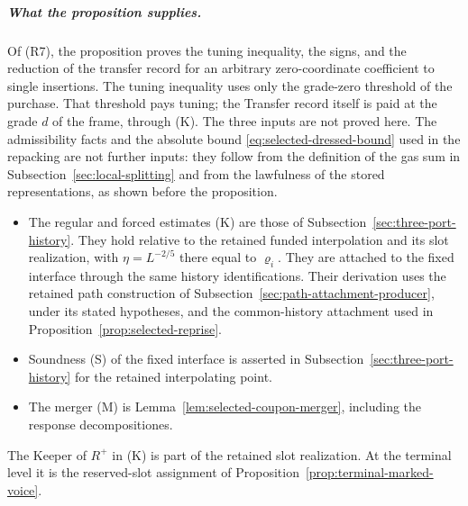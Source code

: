 \subparagraph{What the proposition supplies.}
Of (R7), the proposition proves the tuning inequality, the signs, and
the reduction of the transfer record for an arbitrary zero-coordinate
coefficient to single insertions. The tuning inequality uses only the
grade-zero threshold of the purchase. That threshold pays tuning; the
Transfer record itself is paid at the grade $d$ of the frame, through (K). The
three inputs are not proved here. The admissibility facts and the
absolute bound \eqref{eq:selected-dressed-bound} used in the repacking
are not further inputs: they follow from the definition of the gas sum
in Subsection~\ref{sec:local-splitting} and from the lawfulness of the
stored representations, as shown before the proposition.
\begin{itemize}
\item The regular and forced estimates (K) are those of
  Subsection~\ref{sec:three-port-history}. They hold relative to the
  retained funded interpolation and its slot realization, with
  $\eta=L^{-2/5}$ there equal to $\varrho_i$. They are attached to the
  fixed interface through the same history identifications. Their
  derivation uses the retained path construction of
  Subsection~\ref{sec:path-attachment-producer}, under its stated hypotheses,
  and the common-history attachment used in
  Proposition~\ref{prop:selected-reprise}.
\item Soundness (S) of the fixed interface is asserted in
  Subsection~\ref{sec:three-port-history} for the retained interpolating
  point.
\item The merger (M) is Lemma~\ref{lem:selected-coupon-merger}, including
  the response decompositiones.
\end{itemize}
The Keeper of $R^+$ in (K) is part of the retained slot realization.
At the terminal level it is the reserved-slot assignment of
Proposition~\ref{prop:terminal-marked-voice}.
